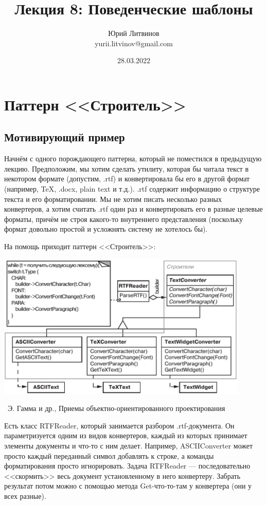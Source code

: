 \documentclass[a5paper]{article}
\title{Лекция 8: Поведенческие шаблоны}
\author{Юрий Литвинов\\\small{yurii.litvinov@gmail.com}}
\date{28.03.2022}
\newcommand{\attribution}[1] {
    \vspace{-5mm}\begin{flushright}\begin{scriptsize}%
    {\textcopyright\, #1}\end{scriptsize}\end{flushright}
}
\begin{document}
\maketitle
\thispagestyle{empty}

\section{Паттерн <<Строитель>>}

\subsection{Мотивирующий пример}

Начнём с одного порождающего паттерна, который не поместился в предыдущую лекцию. Предположим, мы хотим сделать утилиту, которая бы читала текст в некотором формате (допустим, .rtf) и конвертировала бы его в другой формат (например, TeX, .docx, plain text и т.д.). .rtf содержит информацию о структуре текста и его форматировании. Мы не хотим писать несколько разных конвертеров, а хотим считать .rtf один раз и конвертировать его в разные целевые форматы, причём не строя какого-то внутреннего представления (поскольку формат довольно простой и усложнять систему не хотелось бы).

На помощь приходит паттерн <<Строитель>>:

\begin{center}
    \includegraphics[width=0.9\textwidth]{textConverter.png}
    \attribution{Э. Гамма и др., Приемы объектно-ориентированного проектирования}
\end{center}

Есть класс RTFReader, который занимается разбором .rtf-документа. Он параметризуется одним из видов конвертеров, каждый из которых принимает элементы документы и что-то с ним делает. Например, ASCIIConverter может просто каждый переданный символ добавлять к строке, а команды форматирования просто игнорировать. Задача RTFReader --- последовательно <<скормить>> весь документ установленному в него конвертеру. Забрать результат потом можно с помощью метода Get-что-то-там у конвертера (они у всех разные).
\end{document}
